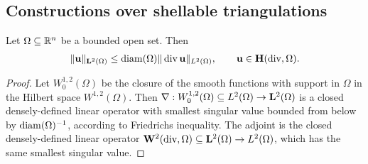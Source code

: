 \documentclass[12pt,a4paper]{article}
\begin{document}
\subsection{Constructions over shellable triangulations}



\begin{lemma}
    Let $\Omega \subseteq {\mathbb R}^{n}$ be a bounded open set. Then 
    \begin{align*}
        \| {\mathbf u} \|_{{\mathbf L}^{2}(\Omega)} \leq {\operatorname{diam}}(\Omega) \| \operatorname{div} {\mathbf u} \|_{L^{2}(\Omega)},
        \qquad 
        {\mathbf u} \in {\mathbf H}(\operatorname{div},\Omega)
        .
    \end{align*}
\end{lemma}
\begin{proof}
    Let $W^{1,2}_{0}(\Omega)$ be the closure of the smooth functions with support in $\Omega$ in the Hilbert space $W^{1,2}(\Omega)$. 
    Then $\nabla : W^{1,2}_{0}(\Omega) \subseteq L^{2}(\Omega) \rightarrow {\mathbf L}^{2}(\Omega)$ is a closed densely-defined linear operator 
    with smallest singular value bounded from below by ${\operatorname{diam}}(\Omega)^{-1}$, according to Friedrichs inequality. 
    The adjoint is the closed densely-defined linear operator ${\mathbf W}^{2}(\operatorname{div},\Omega) \subseteq {\mathbf L}^{2}(\Omega) \rightarrow L^{2}(\Omega)$,
    which has the same smallest singular value. 
\end{proof}
\end{document}
